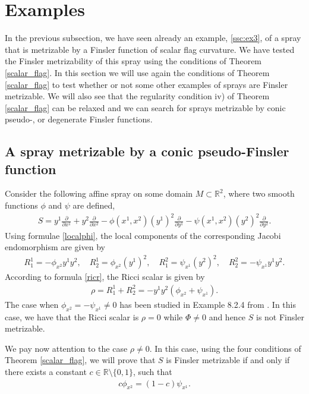 \documentclass[oneside,english]{amsart}
\numberwithin{equation}{section}
\numberwithin{figure}{section}
\theoremstyle{plain}
\theoremstyle{plain}
\theoremstyle{definition}
\theoremstyle{plain}
\theoremstyle{plain}
\theoremstyle{plain}
\theoremstyle{remark}
\theoremstyle{remark}
\begin{document}
\section{Examples}
\label{sec:examples}

In the previous subsection, we have seen already an example,
\eqref{ssc:ex3}, of a spray that is metrizable by a Finsler function
of scalar flag curvature. We have tested the Finsler metrizability of
this spray using the conditions of Theorem \ref{scalar_flag}. In this
section we will use again the conditions of Theorem \ref{scalar_flag} to
test whether or not some other examples of sprays are Finsler
metrizable. We will also see that the regularity condition iv) of
Theorem \ref{scalar_flag} can be relaxed and we can search for sprays
metrizable by conic pseudo-, or degenerate Finsler functions. 

\subsection{A spray metrizable by a conic pseudo-Finsler function} 

Consider the following affine spray on some domain $M\subset
\mathbb{R}^2$, where two smooth functions $\phi$ and $\psi$ are defined,
\begin{eqnarray*}
  S=y^1\frac{\partial}{\partial x^1} + y^2\frac{\partial}{\partial x^2}
  - \phi(x^1, x^2) (y^1)^2 \frac{\partial}{\partial y^1} - \psi(x^1,
  x^2) (y^2)^2 \frac{\partial}{\partial y^2}. \end{eqnarray*} 
Using formulae \eqref{localphi},  the local components of the
corresponding Jacobi endomorphism  are given by
\begin{eqnarray*}
  R^1_1= -\phi_{x^2}y^1y^2, \quad R^1_2 = \phi_{x^2}(y^1)^2, \quad  R^2_1 =
  \psi_{x^1} (y^2)^2, \quad R^2_2=
  -\psi_{x^1}y^1y^2 . \end{eqnarray*}
According to formula \eqref{ricr}, the Ricci scalar is given by 
\begin{eqnarray*} \rho= R^1_1+R^2_2=-y^1y^2(\phi_{x^2} +
  \psi_{x^1}). \end{eqnarray*}
The case when $\phi_{x^2} =-  \psi_{x^1} \neq 0$ has been studied in
Example 8.2.4 from \cite{Shen01}. In this case, we have that the Ricci
scalar is $\rho=0$ while $\Phi\neq 0$ and hence $S$ is not Finsler metrizable. 

We pay now attention to the case $\rho\neq 0$. In this case, using the four conditions of Theorem \ref{scalar_flag}, we will prove that $S$ is Finsler metrizable if and only if there exists
a constant $c\in \mathbb{R}\setminus\{0,1\}$, such that 
\begin{eqnarray}
  c\phi_{x^2}=(1-c)\psi_{x^1}. \label{exfpc}
\end{eqnarray}
\end{document}
